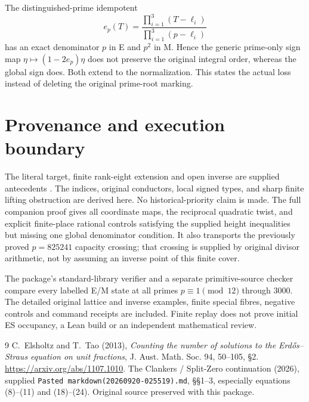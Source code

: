 The distinguished-prime idempotent
\[
 e_p(T)=\frac{\prod_{i=1}^3(T-\ell_i)}{\prod_{i=1}^3(p-\ell_i)}
\]
has an exact denominator $p$ in E and $p^2$ in M. Hence the generic prime-only
sign map $\eta\mapsto(1-2e_p)\eta$ does not preserve the original integral
order, whereas the global sign does. Both extend to the normalization. This
states the actual loss instead of deleting the original prime-root marking.

\section{Provenance and execution boundary}
The literal target, finite rank-eight extension and open inverse are supplied
antecedents \cite{Input}. The indices, original conductors, local signed types,
and sharp finite lifting obstruction are derived here. No historical-priority
claim is made. The full companion proof gives all coordinate maps, the reciprocal
quadratic twist, and explicit finite-place rational controls satisfying the
supplied height inequalities but missing one global denominator condition.
It also transports the previously proved $p=825241$ capacity crossing; that
crossing is supplied by original divisor arithmetic, not by assuming an inverse
point of this finite cover.

The package's standard-library verifier and a separate primitive-source checker
compare every labelled E/M state at all primes $p\equiv1\pmod{12}$ through 3000.
The detailed original lattice and inverse examples, finite special fibres,
negative controls and command receipts are included. Finite replay does not
prove initial ES occupancy, a Lean build or an independent mathematical review.
\begin{thebibliography}{9}
 C.~Elsholtz and T.~Tao (2013), \emph{Counting the number of solutions
to the Erd\H{o}s--Straus equation on unit fractions}, J. Aust. Math. Soc. 94,
50--105, \S2. \url{https://arxiv.org/abs/1107.1010}.
 The Clankers / Split-Zero continuation (2026), supplied
\texttt{Pasted markdown(20260920-025519).md}, \S\S1--3, especially equations
(8)--(11) and (18)--(24). Original source preserved with this package.
\end{thebibliography}

